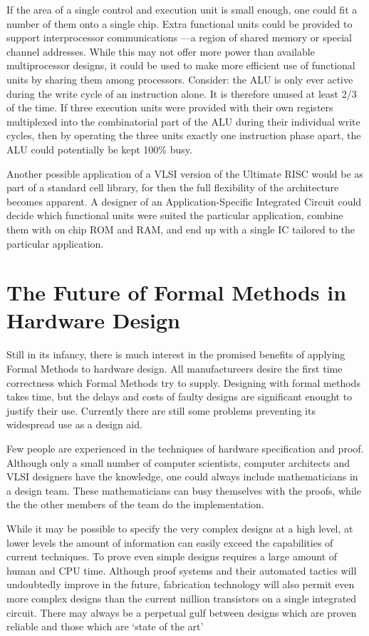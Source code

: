 If the area of a single control and execution unit is small enough, one could fit a number of them onto a single chip. 
Extra functional units could be provided to support interprocessor communications ---a region of shared memory or special channel addresses.
While this may not offer  more power than available multiprocessor designs, it could be used to make more efficient use of functional units by sharing them among processors.
Consider: the ALU is only ever active during the write cycle of an instruction alone. It is therefore unused at least 2/3 of the time.
If three execution units were provided with their own registers  multiplexed into the combinatorial part of the ALU during their individual write cycles, 
then by operating the three units exactly one instruction phase apart, the ALU could potentially be kept  100\% busy. 

Another possible application of a VLSI version of the Ultimate RISC would be as part of a standard cell library, for then the full flexibility of the architecture becomes apparent. 
A designer of an Application-Specific Integrated Circuit could decide which functional units were suited the particular application, combine them with 
on chip ROM and RAM, and end up with a single IC tailored to the particular application.

\section{The Future of Formal Methods in Hardware Design}

Still in its infancy, there is much interest in the promised benefits of applying Formal Methods to hardware design.
All manufactureers desire the first time correctness which Formal Methods try to supply.
Designing with formal methods takes time, but the delays and costs of faulty designs are significant enought to justify their use.
Currently there are still some problems preventing its widespread use as a design aid.

Few people are experienced in the techniques of hardware specification and proof.
Although  only a small number of computer scientists, computer architects and VLSI designers have the knowledge, one could always include mathematicians in a design team.
These mathematicians can busy themselves with the proofs, while the the other members of the team  do the implementation.

While it may be possible to specify the very complex designs at a high level, at lower levels the amount of information can easily exceed the capabilities of current techniques.
To prove even simple designs requires a large amount of human and CPU time.
Although proof systems and their automated tactics will undoubtedly improve in the future, fabrication technology will also permit even more complex designs than the current million transistors on a single integrated circuit.
There may always be a perpetual gulf between designs which are proven reliable and  those which are `state of the art'

